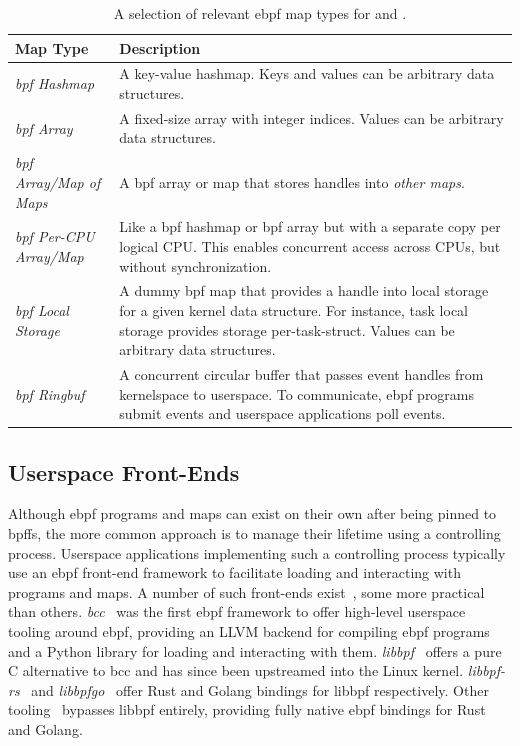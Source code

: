 \begingroup\footnotesize
\begin{longtable}[c]{lp{3.9in}}
\caption[A selection of relevant eBPF map types for \bpfbox{} and \bpfcontain{}]{A selection of relevant \gls{ebpf} map types for \bpfbox{} and \bpfcontain{}.}%
\label{tab:map-types}\\
  \toprule
  Map Type & Description\\
  \midrule
  \textit{\gls{bpf} Hashmap}           & A key-value hashmap. Keys and values can be arbitrary data structures.\\
  \textit{\gls{bpf} Array}             & A fixed-size array with integer indices. Values can be arbitrary data structures.\\
  \textit{\gls{bpf} Array/Map of Maps} & A \gls{bpf} array or map that stores handles into \textit{other maps}.\\
  \textit{\gls{bpf} Per-CPU Array/Map} & Like a \gls{bpf} hashmap or \gls{bpf} array but with a separate copy per logical CPU\@. This enables concurrent access across CPUs, but without synchronization.\\
  \textit{\gls{bpf} Local Storage}     & A dummy \gls{bpf} map that provides a handle into local storage for a given kernel data structure. For instance, task local storage provides storage per-task-struct. Values can be arbitrary data structures.\\
  \textit{\gls{bpf} Ringbuf}           & A concurrent circular buffer that passes event handles from kernelspace to userspace. To communicate, \gls{ebpf} programs submit events and userspace applications poll events.\\
  \bottomrule
\end{longtable}
\endgroup

\subsection{Userspace Front-Ends}%
\label{ss:bpf-userspace}

Although \gls{ebpf} programs and maps can exist on their own after being pinned to
\gls{bpffs}, the more common approach is to manage their lifetime using a controlling
process. Userspace applications implementing such a controlling process typically use an
\gls{ebpf} front-end framework to facilitate loading and interacting with programs and maps.
A number of such front-ends exist~\cite{gobpf, bcc, libbpf, libbpf-rs, libbpfgo,
cilium-ebpf, redbpf}, some more practical than others.
\textit{bcc}~\cite{bcc} was the first \gls{ebpf} framework to offer high-level userspace tooling
around \gls{ebpf}, providing an LLVM backend for compiling \gls{ebpf} programs and a Python library
for loading and interacting with them. \textit{libbpf}~\cite{libbpf} offers a pure
C alternative to bcc and has since been upstreamed into the Linux kernel.
\textit{libbpf-rs}~\cite{libbpf-rs} and \textit{libbpfgo}~\cite{libbpfgo} offer Rust
and Golang bindings for libbpf respectively. Other tooling~\cite{cilium-ebpf, redbpf}
bypasses libbpf entirely, providing fully native \gls{ebpf} bindings for Rust and Golang.

